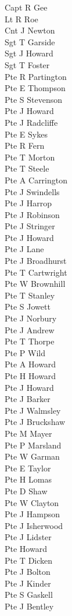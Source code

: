 \begin{multicols}{2}
  \noindent
  Capt R Gee \\
  Lt R Roe \\
  Cnt J Newton \\
  Sgt T Garside \\
  Sgt J Howard \\
  Sgt T Foster \\
  Pte R Partington \\
  Pte E Thompson \\
  Pte S Stevenson \\
  Pte J Howard \\
  Pte J Radcliffe \\
  Pte E Sykes \\
  Pte R Fern \\
  Pte T Morton \\
  Pte T Steele \\
  Pte A Carrington \\
  Pte J Swindells \\
  Pte J Harrop \\
  Pte J Robinson \\
  Pte J Stringer \\
  Pte J Howard \\
  Pte J Lane \\
  Pte J Broadhurst \\
  Pte T Cartwright \\
  Pte W Brownhill \\
  Pte T Stanley \\
  Pte S Jowett \\
  Pte J Norbury \\
  Pte J Andrew \\
  Pte T Thorpe \\
  Pte P Wild \\
  Pte A Howard \\
  Pte H Howard \\
  Pte J Howard \\
  Pte J Barker \\
  Pte J Walmsley \\
  Pte J Bruckshaw \\
  Pte M Mayer \\
  Pte P Marsland \\
  Pte W Garman \\
  Pte E Taylor \\
  Pte H Lomas \\
  Pte D Shaw \\
  Pte W Clayton \\
  Pte J Hampson \\
  Pte J Isherwood \\
  Pte J Lidster \\
  Pte Howard \\
  Pte T Dicken \\
  Pte J Bolton \\
  Pte J Kinder \\
  Pte S Gaskell \\
  Pte J Bentley \\
\end{multicols}
